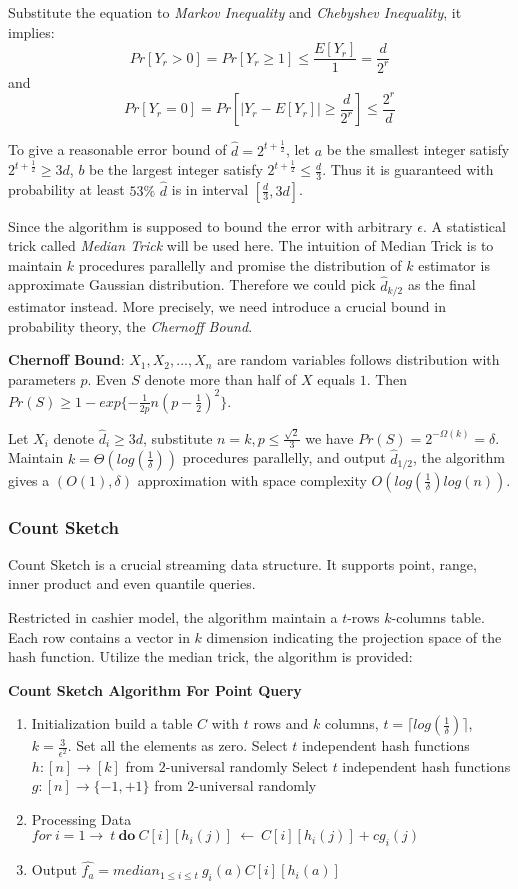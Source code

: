 \documentclass{article} %
\begin{document}
Substitute the equation to \emph{Markov Inequality} and \emph{Chebyshev Inequality}, it implies:
$$Pr[Y_r > 0] = Pr[Y_r \ge 1] \le \frac{E[Y_r]}{1} = \frac{d}{2^r}$$
and
$$Pr[Y_r = 0] = Pr[|Y_r - E[Y_r]| \ge \frac{d}{2^r}] \le \frac{2^r}{d}$$

To give a reasonable error bound of $\hat{d} = 2^{t + \frac{1}{2}}$, let $a$ be the smallest integer satisfy $2^{t + \frac{1}{2}} \ge 3d$, $b$ be the largest integer satisfy $2^{t + \frac{1}{2}} \le \frac{d}{3}$. Thus it is guaranteed with probability at least $53\%$ $\hat{d}$ is in interval $[\frac{d}{3}, 3d]$.

Since the algorithm is supposed to bound the error with arbitrary $\epsilon$. A statistical trick called \emph{Median Trick} will be used here. The intuition of Median Trick is to maintain $k$ procedures parallelly and promise the distribution of $k$ estimator is approximate Gaussian distribution. Therefore we could pick $\hat{d}_{k/2}$ as the final estimator instead. More precisely, we need introduce a crucial bound in probability theory, the \emph{Chernoff Bound}.

\textbf{Chernoff Bound}: $X_1, X_2, ..., X_n$ are random variables follows distribution with parameters $p$. Even $S$ denote more than half of $X$ equals $1$. Then $Pr(S) \ge 1 - exp\{-\frac{1}{2p}n(p-\frac{1}{2})^2\}$.

Let $X_i$ denote $\hat{d}_i \ge 3d$, substitute $n = k, p \le \frac{\sqrt{2}}{3} $ we have $Pr(S) = 2^{-\Omega(k)} = \delta $. Maintain $k = \Theta(log(\frac{1}{\delta})) $ procedures parallelly, and output $\hat{d}_{1/2}$, the algorithm gives a $(O(1), \delta) $ approximation with space complexity $O(log(\frac{1}{\delta})log(n))$.

\subsubsection{Count Sketch}
Count Sketch is a crucial streaming data structure. It supports point, range, inner product and even quantile queries.

Restricted in cashier model, the algorithm maintain a $t$-rows $k$-columns table. Each row contains a vector in $k$ dimension indicating the projection space of the hash function. Utilize the median trick, the algorithm is provided:

\textbf{Count Sketch Algorithm For Point Query}
\begin{enumerate}
\item Initialization
\subitem build a table $C$ with $t$ rows and $k$ columns, $t = \lceil log(\frac{1}{\delta}) \rceil$, $k = \frac{3}{\epsilon^2} $. Set all the elements as zero.
\subitem Select $t$ independent hash functions $h : [n] \rightarrow [k]$ from $2$-universal randomly
\subitem Select $t$ independent hash functions $g : [n] \rightarrow \{-1, +1\}$ from $2$-universal randomly
\item Processing Data
\subitem $for \ i = 1 \rightarrow \ t \ \mathbf{do} \ C[i][h_i(j)] \ \leftarrow \ C[i][h_i(j)] + cg_i(j) $
\item Output
\subitem $\hat{f_a} = median_{1 \le i \le t} \ g_i(a)C[i][h_i(a)] $
\end{enumerate}
\end{document}
